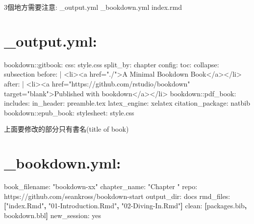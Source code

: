 \documentclass[]{book}
\newenvironment{Shaded}{\begin{snugshade}}{\end{snugshade}}
\newcommand{\KeywordTok}[1]{\textcolor[rgb]{0.13,0.29,0.53}{\textbf{#1}}}
\newcommand{\StringTok}[1]{\textcolor[rgb]{0.31,0.60,0.02}{#1}}
\newcommand{\FunctionTok}[1]{\textcolor[rgb]{0.00,0.00,0.00}{#1}}
\newcommand{\AttributeTok}[1]{\textcolor[rgb]{0.77,0.63,0.00}{#1}}
\newcommand{\NormalTok}[1]{#1}
\theoremstyle{definition}
\theoremstyle{definition}
\theoremstyle{definition}
\theoremstyle{remark}
\begin{document}
3個地方需要注意: \_output.yml \_bookdown.yml index.rmd

\section{\_output.yml:}\label{output.yml}

\begin{Shaded}
\begin{Highlighting}[]
\FunctionTok{bookdown:}\AttributeTok{:gitbook:}
  \FunctionTok{css:}\AttributeTok{ style.css}
  \FunctionTok{split_by:}\AttributeTok{ chapter}
  \FunctionTok{config:}
    \FunctionTok{toc:}
      \FunctionTok{collapse:}\AttributeTok{ subsection}
      \FunctionTok{before:}\AttributeTok{ |}
\NormalTok{        <li><a href=}\StringTok{"./"}\NormalTok{>A Minimal Bookdown Book</a></li>}
      \FunctionTok{after:}\AttributeTok{ |}
        \FunctionTok{<li><a href="https:}\AttributeTok{//github.com/rstudio/bookdown" target="blank">Published with bookdown</a></li>}
\FunctionTok{bookdown:}\AttributeTok{:pdf_book:}
  \FunctionTok{includes:}
    \FunctionTok{in_header:}\AttributeTok{ preamble.tex}
  \FunctionTok{latex_engine:}\AttributeTok{ xelatex}
  \FunctionTok{citation_package:}\AttributeTok{ natbib}
\FunctionTok{bookdown:}\AttributeTok{:epub_book:}
  \FunctionTok{stylesheet:}\AttributeTok{ style.css}
  
\end{Highlighting}
\end{Shaded}

上面要修改的部分只有書名(title of book)

\section{\_bookdown.yml:}\label{bookdown.yml}

\begin{Shaded}
\begin{Highlighting}[]

\FunctionTok{book_filename:}\AttributeTok{ }\StringTok{"bookdown-xx"}
\FunctionTok{chapter_name:}\AttributeTok{ }\StringTok{"Chapter "}
\FunctionTok{repo:}\AttributeTok{ https://github.com/seankross/bookdown-start}
\FunctionTok{output_dir:}\AttributeTok{ docs}
\FunctionTok{rmd_files:}\AttributeTok{ }\KeywordTok{[}\StringTok{"index.Rmd"}\KeywordTok{,} \StringTok{"01-Introduction.Rmd"}\KeywordTok{,} \StringTok{"02-Diving-In.Rmd"}\KeywordTok{]}
\FunctionTok{clean:}\AttributeTok{ }\KeywordTok{[}\NormalTok{packages.bib}\KeywordTok{,}\NormalTok{ bookdown.bbl}\KeywordTok{]}
\FunctionTok{new_session:}\AttributeTok{ yes}
\end{Highlighting}
\end{Shaded}
\end{document}
